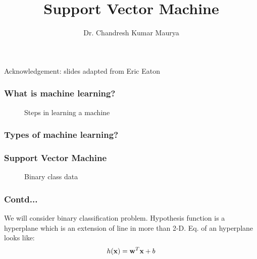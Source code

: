 \documentclass[blue]{beamer}
\title{Support Vector Machine}
\author[Dr. Chandresh]{Dr. Chandresh Kumar Maurya }
\institute{IBM Research, Bangalore}
\begin{document}
\titlepage 
{\footnotesize Acknowledgement: slides adapted from Eric Eaton}

\begin{frame}
\frametitle{What is machine learning?}
\begin{figure}
\caption{Steps in learning a machine}
\end{figure}


\end{frame}
\begin{frame}
\frametitle{Types of machine learning?}
\begin{figure}

\end{figure}


\end{frame}



\begin{frame}
\frametitle{Support Vector Machine}

\begin{figure}
\caption{Binary class data}
\end{figure}
\end{frame}

\begin{frame}
\frametitle{Contd...}
We will consider binary classification problem.  Hypothesis function is a hyperplane which is an extension of line in more than 2-D.
Eq. of an hyperplane  looks like:
\begin{equation}
h(\mathbf{x}) = {\bf w}^T\mathbf{x}+b
\end{equation}

\end{frame}
\end{document}

